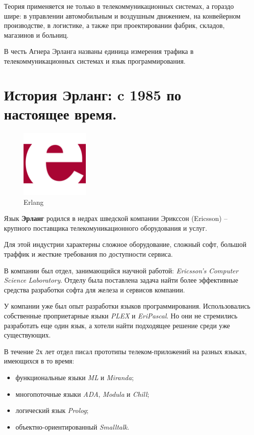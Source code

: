 Теория применяется не только в телекоммуникационных системах, а гораздо шире: в управлении автомобильным и воздушным движением, на конвейерном производстве, в логистике, а также при проектировании фабрик, складов, магазинов и больниц.

В честь Агнера Эрланга названы единица измерения трафика в телекоммуникационных системах и язык программирования.

\section{История Эрланг: c 1985 по настоящее время.}

\begin{figure}[h]
  \centering
  \includegraphics[width=0.3\textwidth]{../lesson_02/img/erlang_logo.png}
  \caption{Erlang}
\end{figure}

Язык \textbf{Эрланг} родился в недрах шведской компании Эрикссон (Ericsson) -- крупного поставщика телекомуникационного оборудования и услуг.

Для этой индустрии характерны сложное оборудование, сложный софт, большой траффик и жесткие требования по доступности сервиса.

В компании был отдел, занимающийся научной работой: \textit{Ericsson’s Computer Science Laboratory}. Отделу была поставлена задача найти более эффективные средства разработки софта для железа и сервисов компании.

У компании уже был опыт разработки языков программирования. Использовались собственные проприетарные языки \textit{PLEX} и \textit{EriPascal}. Но они не стремились разработать еще один язык, а хотели найти подходящее решение среди уже существующих.

В течение 2х лет отдел писал прототипы телеком-приложений на разных языках, имеющихся в то время:
\begin{itemize}
\item функциональные языки \textit{ML} и \textit{Miranda};
\item многопоточные языки \textit{ADA}, \textit{Modula} и \textit{Chill};
\item логический язык \textit{Prolog};
\item объектно-ориентированный \textit{Smalltalk}.
\end{itemize}


